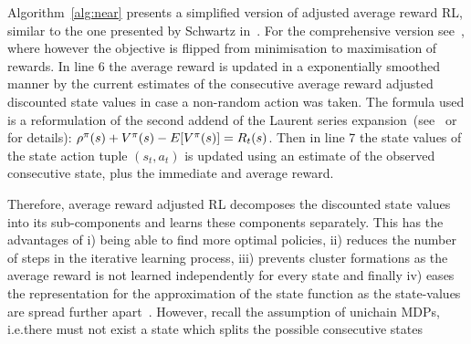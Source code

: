 \documentclass[envcountsame]{llncs}
\begin{document}
Algorithm~\ref{alg:near} presents a simplified version of adjusted average reward RL, similar to the
one presented by Schwartz in~\cite{schwartz1993reinforcement}. For the comprehensive version
see~\cite{schneckenreither2020average}, where however the objective is flipped from minimisation to
maximisation of rewards. In line 6 the average reward is updated in a exponentially smoothed manner
by the current estimates of the consecutive average reward adjusted discounted state values in case
a non-random action was taken. The formula used is a reformulation of the second addend of the
Laurent series expansion~(see~\cite{MillerVeinott1969} or~\cite[p.346]{Puterman94} for details):
\(\rho^{\pi}(s) + V^{\pi}(s) - E[V^{\pi}(s)] = R_{t}(s)\). Then in line 7 the state values of
the state action tuple \((s_{t}, a_{t})\) is updated using an estimate of the observed consecutive
state, plus the immediate and average reward.

Therefore, average reward adjusted RL decomposes the discounted state values into its sub-components
and learns these components separately. This has the advantages of i) being able to find more
optimal policies, ii) reduces the number of steps in the iterative learning process, iii) prevents
cluster formations as the average reward is not learned independently for every state and finally iv)
eases the representation for the approximation of the state function as the state-values are spread
further apart~\cite{schneckenreither2020average}. However, recall the assumption of unichain MDPs,
i.e.\@ there must not exist a state which splits the possible consecutive states 
\end{document}
